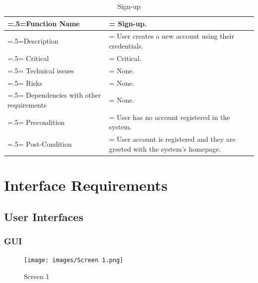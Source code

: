 \begin{center}
    \begin{table}[H]
        \caption{Sign-up}
        \begin{tabularx}{\textwidth} {
                | >{\raggedright\arraybackslash\hsize=.5\hsize\linewidth=\hsize}X
                | >{\raggedright\arraybackslash\hsize=1.5\hsize\linewidth=\hsize}X |}
            \hline
            Function Name                        & Sign-up.                                                                    \\ \hline
            Description                          & User creates a new account using their credentials.                         \\ \hline
            Critical                             & Critical.                                                                   \\ \hline
            Technical issues                     & None.                                                                       \\ \hline
            Risks                                & None.                                                                       \\ \hline
            Dependencies with other requirements & None.                                                                       \\ \hline
            Precondition                         & User has no account registered in the system.                               \\ \hline
            Post-Condition                       & User account is registered and they are greeted with the system's homepage. \\ \hline
        \end{tabularx}
    \end{table}
\end{center}

\section{Interface Requirements}
\subsection{User Interfaces}
\subsubsection {GUI}
\begin{figure}[H]
    \texttt{[image: images/Screen 1.png]}
    \caption{Screen 1}
\end{figure}

